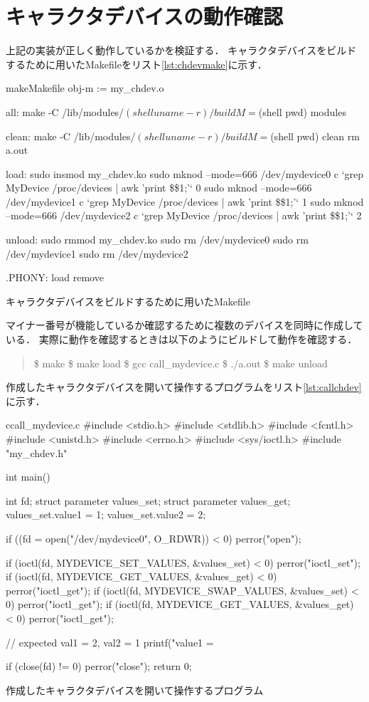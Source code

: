 \section{キャラクタデバイスの動作確認}
上記の実装が正しく動作しているかを検証する．
キャラクタデバイスをビルドするために用いたMakefileをリスト\ref{lst:chdevmake}に示す．
\begin{longlisting}
\begin{myminted}{make}{Makefile}
obj-m := my_chdev.o

all:
	make -C /lib/modules/$(shell uname -r)/build M=$(shell pwd) modules

clean:
	make -C /lib/modules/$(shell uname -r)/build M=$(shell pwd) clean
	rm a.out

load:
	sudo insmod my_chdev.ko
	sudo mknod --mode=666 /dev/mydevice0 c `grep MyDevice /proc/devices | awk '{print \$\$1;}'` 0
	sudo mknod --mode=666 /dev/mydevice1 c `grep MyDevice /proc/devices | awk '{print \$\$1;}'` 1
	sudo mknod --mode=666 /dev/mydevice2 c `grep MyDevice /proc/devices | awk '{print \$\$1;}'` 2

unload:
	sudo rmmod my_chdev.ko
	sudo rm /dev/mydevice0
	sudo rm /dev/mydevice1
	sudo rm /dev/mydevice2


.PHONY: load remove
\end{myminted}
\caption{キャラクタデバイスをビルドするために用いたMakefile}
\label{lst:chdevmake}
\end{longlisting}

マイナー番号が機能しているか確認するために複数のデバイスを同時に作成している．
実際に動作を確認するときは以下のようにビルドして動作を確認する．
\begin{quote}
\$ make
\$ make load
\$ gcc call\_mydevice.c
\$ ./a.out
\$ make unload
\end{quote}

作成したキャラクタデバイスを開いて操作するプログラムをリスト\ref{lst:callchdev}に示す．
\begin{longlisting}
\begin{myminted}{c}{call\_mydevice.c}
#include <stdio.h>
#include <stdlib.h>
#include <fcntl.h>
#include <unistd.h>
#include <errno.h>
#include <sys/ioctl.h>
#include "my_chdev.h"

int main() {
    int fd;
    struct parameter values_set;
    struct parameter values_get;
    values_set.value1 = 1;
    values_set.value2 = 2;

    if ((fd = open("/dev/mydevice0", O_RDWR)) < 0) perror("open");

    if (ioctl(fd, MYDEVICE_SET_VALUES, &values_set) < 0) perror("ioctl_set");
    if (ioctl(fd, MYDEVICE_GET_VALUES, &values_get) < 0) perror("ioctl_get");
    if (ioctl(fd, MYDEVICE_SWAP_VALUES, &values_set) < 0) perror("ioctl_get");
    if (ioctl(fd, MYDEVICE_GET_VALUES, &values_get) < 0) perror("ioctl_get");

    // expected val1 = 2, val2 = 1
    printf("value1 = %

    if (close(fd) != 0) perror("close");
    return 0;
}
\end{myminted}
\caption{作成したキャラクタデバイスを開いて操作するプログラム}
\label{lst:callchdev}
\end{longlisting}

